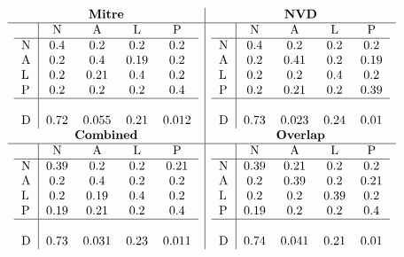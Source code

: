 \documentclass[11pt]{article}
\begin{document}
\begin{table}
	\centering
	\caption{Confusion Matrices for Attack Vector}
	\[
		\begin{array}{c|c}
			\textbf{Mitre}    & \textbf{NVD}     \\
			\hline
			\begin{tabular}{l|cccc}
				  & N    & A     & L    & P     \\
				\hline
				N & 0.4  & 0.2   & 0.2  & 0.2   \\
				A & 0.2  & 0.4   & 0.19 & 0.2   \\
				L & 0.2  & 0.21  & 0.4  & 0.2   \\
				P & 0.2  & 0.2   & 0.2  & 0.4   \\
				\hline                          \\
				D & 0.72 & 0.055 & 0.21 & 0.012 \\
			\end{tabular}
			                  &
			\begin{tabular}{l|cccc}
				  & N    & A     & L    & P    \\
				\hline
				N & 0.4  & 0.2   & 0.2  & 0.2  \\
				A & 0.2  & 0.41  & 0.2  & 0.19 \\
				L & 0.2  & 0.2   & 0.4  & 0.2  \\
				P & 0.2  & 0.21  & 0.2  & 0.39 \\
				\hline                         \\
				D & 0.73 & 0.023 & 0.24 & 0.01 \\
			\end{tabular}
			\\
			\textbf{Combined} & \textbf{Overlap} \\
			\hline
			\begin{tabular}{l|cccc}
				  & N    & A     & L    & P     \\
				\hline
				N & 0.39 & 0.2   & 0.2  & 0.21  \\
				A & 0.2  & 0.4   & 0.2  & 0.2   \\
				L & 0.2  & 0.19  & 0.4  & 0.2   \\
				P & 0.19 & 0.21  & 0.2  & 0.4   \\
				\hline                          \\
				D & 0.73 & 0.031 & 0.23 & 0.011 \\
			\end{tabular}
			                  &
			\begin{tabular}{l|cccc}
				  & N    & A     & L    & P    \\
				\hline
				N & 0.39 & 0.21  & 0.2  & 0.2  \\
				A & 0.2  & 0.39  & 0.2  & 0.21 \\
				L & 0.2  & 0.2   & 0.39 & 0.2  \\
				P & 0.19 & 0.2   & 0.2  & 0.4  \\
				\hline                         \\
				D & 0.74 & 0.041 & 0.21 & 0.01 \\
			\end{tabular}
		\end{array}
	\]
\end{table}
\end{document}
